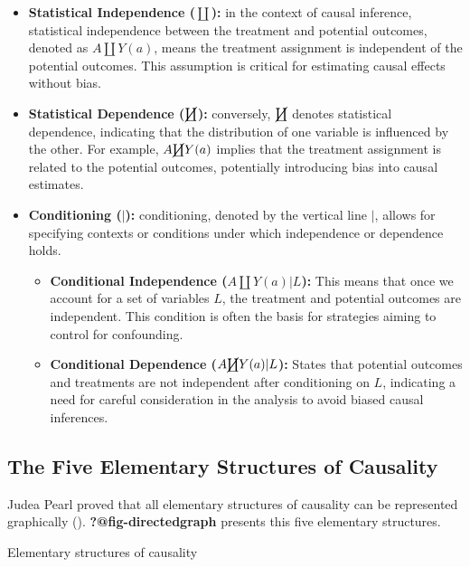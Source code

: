 \documentclass[
  single column]{article}
\begin{document}
\begin{itemize}
\item
  \textbf{Statistical Independence (\(\coprod\)):} in the context of
  causal inference, statistical independence between the treatment and
  potential outcomes, denoted as \(A \coprod Y(a)\), means the treatment
  assignment is independent of the potential outcomes. This assumption
  is critical for estimating causal effects without bias.
\item
  \textbf{Statistical Dependence (\(\cancel\coprod\)):} conversely,
  \(\cancel\coprod\) denotes statistical dependence, indicating that the
  distribution of one variable is influenced by the other. For example,
  \(A \cancel\coprod Y(a)\) implies that the treatment assignment is
  related to the potential outcomes, potentially introducing bias into
  causal estimates.
\item
  \textbf{Conditioning (\(|\)):} conditioning, denoted by the vertical
  line \(|\), allows for specifying contexts or conditions under which
  independence or dependence holds.

  \begin{itemize}
  \item
    \textbf{Conditional Independence (\(A \coprod Y(a)|L\)):} This means
    that once we account for a set of variables \(L\), the treatment and
    potential outcomes are independent. This condition is often the
    basis for strategies aiming to control for confounding.
  \item
    \textbf{Conditional Dependence (\(A \cancel\coprod Y(a)|L\)):}
    States that potential outcomes and treatments are not independent
    after conditioning on \(L\), indicating a need for careful
    consideration in the analysis to avoid biased causal inferences.
  \end{itemize}
\end{itemize}

\subsection{The Five Elementary Structures of
Causality}\label{the-five-elementary-structures-of-causality}

Judea Pearl proved that all elementary structures of causality can be
represented graphically ().
\textbf{?@fig-directedgraph} presents this five elementary structures.

\begin{table}

\caption{\label{tbl-fiveelementary}Elementary structures of causality}

\centering{

\terminologydirectedgraph

}

\end{table}%
\end{document}
